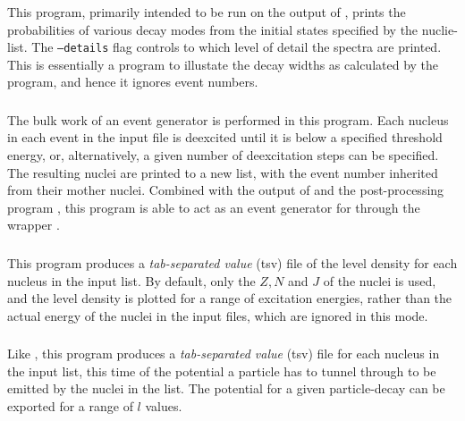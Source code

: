 \subsubsection{}
This program, primarily intended to be run on the output of , prints the probabilities of various decay modes from the initial states specified by the nuclie-list. The \texttt{--details} flag controls to which level of detail the spectra are printed. This is essentially a program to illustate the decay widths as calculated by the program, and hence it ignores event numbers.

\subsubsection{}
The bulk work of an event generator is performed in this program. Each nucleus in each event in the input file is deexcited until it is below a specified threshold energy, or, alternatively, a given number of deexcitation steps can be specified. The resulting nuclei are printed to a new list, with the event number inherited from their mother nuclei. Combined with the output of  and the post-processing program , this program is able to act as an event generator for  through the wrapper .

\subsubsection{}
This program produces a \emph{tab-separated value} (tsv) file of the level density for each nucleus in the input list. By default, only the $Z, N$ and $J$ of the nuclei is used, and the level density is plotted for a range of excitation energies, rather than the actual energy of the nuclei in the input files, which are ignored in this mode.

\subsubsection{}
Like , this program produces a \emph{tab-separated value} (tsv) file for each nucleus in the input list, this time of the potential a particle has to tunnel through to be emitted by the nuclei in the list. The potential for a given particle-decay can be exported for a range of $l$ values.

